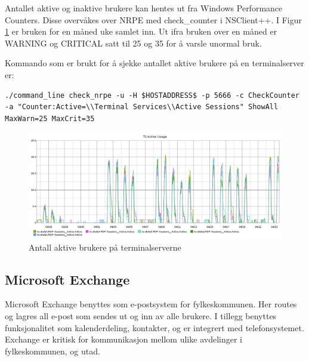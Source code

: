 Antallet aktive og inaktive brukere kan hentes ut fra Windows Performance Counters. Disse overvåkes over NRPE med check\_counter i NSClient++. I Figur \ref{ts-skole-usage} er bruken for en måned uke samlet inn. Ut ifra bruken over en måned er WARNING og CRITICAL satt til 25 og 35 for å varsle unormal bruk.

Kommando som er brukt for å sjekke antallet aktive brukere på en terminalserver er:
\begin{lstlisting}[style=example]
./command_line check_nrpe -u -H $HOSTADDRESS$ -p 5666 -c CheckCounter -a "Counter:Active=\\Terminal Services\\Active Sessions" ShowAll MaxWarn=25 MaxCrit=35
\end{lstlisting}

\begin{figure}[H]
	\centering
	\includegraphics[width=1.0\textwidth]{img/ts-skole-usage-inv}
	\caption{Antall aktive brukere på terminalserverne}
	\label{ts-skole-usage}
\end{figure}

\subsection{Microsoft Exchange}
Microsoft Exchange benyttes som e-postsystem for fylkeskommunen. Her routes og lagres all e-post som sendes ut og inn av alle brukere. I tillegg benyttes funksjonalitet som kalenderdeling, kontakter, og er integrert med telefonsystemet. Exchange er kritisk for kommunikasjon mellom ulike avdelinger i fylkeskommunen, og utad. 

